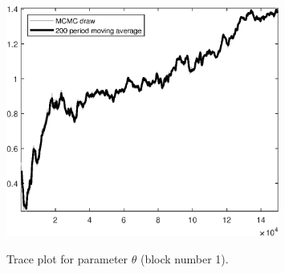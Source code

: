 \begin{figure}[H]
\centering
  \includegraphics[width=0.8\textwidth]{BRS_sectoral_wo_gmf/graphs/TracePlot_theta_blck_1}\\
    \caption{Trace plot for parameter ${\theta}$ (block number 1).}
\end{figure}
